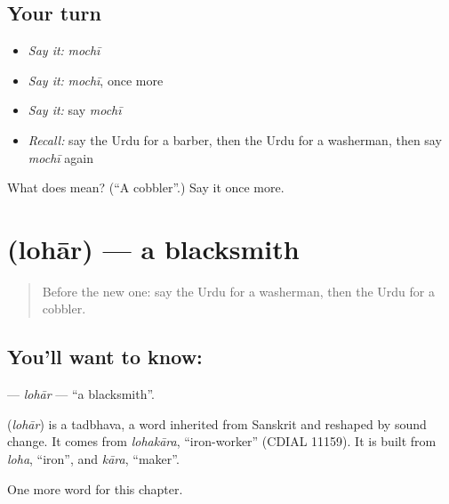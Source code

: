 \subsection*{Your turn}
\begin{itemize}
\raggedright
  \item \emph{Say it:} \emph{mochī}
  \item \emph{Say it:} \emph{mochī}, once more
  \item \emph{Say it:} say \emph{mochī}
  \item \emph{Recall:} say the Urdu for a barber, then the Urdu for a washerman, then say \emph{mochī} again
\end{itemize}

\begin{tcolorbox}[breakable,colback=teal!4,colframe=teal!35!black,title={Before you move on}]
What does  mean? (\textquotedblleft{}A cobbler\textquotedblright{}.) Say it once more.
\end{tcolorbox}
\section[\texorpdfstring{\ur{لوہار} (lohār)}{لوہار (lohār)}]{ (lohār) — a blacksmith}

\label{lesson:UR-C210-lohar}



\begin{quote}
Before the new one: say the Urdu for a washerman, then the Urdu for a cobbler.
\end{quote}

\subsection*{You'll want to know: }
\textbf{} — \emph{lohār} — \textquotedblleft{}a blacksmith\textquotedblright{}.

\begin{cousinweb}
\textbf{} (\emph{lohār}) is a tadbhava, a word inherited from Sanskrit and reshaped by sound change. It comes from \emph{lohakāra}, \textquotedblleft{}iron-worker\textquotedblright{} (CDIAL 11159). It is built from \emph{loha}, \textquotedblleft{}iron\textquotedblright{}, and \emph{kāra}, \textquotedblleft{}maker\textquotedblright{}.
\end{cousinweb}

\begin{grammarlens}[title={What you've built}]
One more word for this chapter.
\end{grammarlens}

